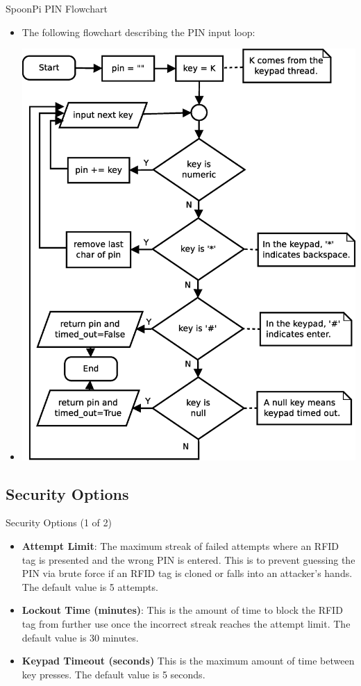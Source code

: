 \begin{frame}{SpoonPi PIN Flowchart}
\begin{itemize}
    \item<1-> The following flowchart describing the PIN input loop:
    \item<2-> \includegraphics[scale=0.32]{pin-input.eps}
\end{itemize}
\end{frame}

\subsection{Security Options}
\begin{frame}{Security Options (1 of 2)}
\begin{itemize}
    \item<1-> \textbf{Attempt Limit}: The maximum streak of failed attempts where an RFID tag is presented and the wrong PIN is entered. This is to prevent guessing the PIN via brute force if an RFID tag is cloned or falls into an attacker's hands. The default value is 5 attempts.
    \item<2-> \textbf{Lockout Time (minutes)}: This is the amount of time to block the RFID tag from further use once the incorrect streak reaches the attempt limit. The default value is 30 minutes.
    \item<3-> \textbf{Keypad Timeout (seconds)} This is the maximum amount of time between key presses. The default value is 5 seconds.
\end{itemize}
\end{frame}

